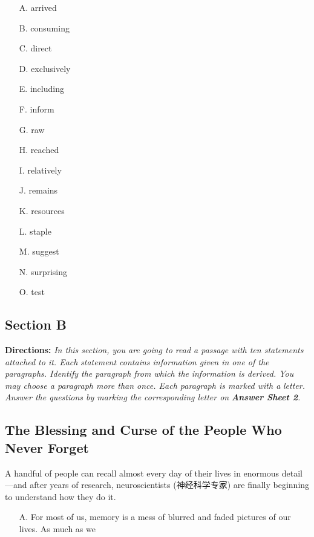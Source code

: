 \documentclass[UTF8,11pt]{ctexart}
\begin{document}
\begin{itemize}[leftmargin=2em,itemsep=.2em,topsep=.4em]\item[A.] arrived
\item[B.] consuming
\item[C.] direct
\item[D.] exclusively
\item[E.] including
\item[F.] inform
\item[G.] raw
\item[H.] reached
\item[I.] relatively
\item[J.] remains
\item[K.] resources
\item[L.] staple
\item[M.] suggest
\item[N.] surprising
\item[O.] test
\end{itemize}

\subsection*{\textbf{Section B}}


\textbf{Directions:}\textit{ In this section, you are going to read a passage with ten statements attached to it. Each} \textit{statement contains information given in one of the paragraphs. Identify the paragraph from which the} \textit{information is derived. You may choose a paragraph more than once. Each paragraph is marked with a} \textit{letter. Answer the questions by marking the corresponding letter on}\textbf{\textit{ Answer Sheet 2}}\textit{.}


\subsection*{\textbf{The Blessing and Curse of the People Who Never Forget}}


A handful of people can recall almost every day of their lives in enormous detail—and after years of research, neuroscientists (神经科学专家) are finally beginning to understand how they do it.


\begin{itemize}[leftmargin=2em,itemsep=.2em,topsep=.4em]\item[A.] For most of us, memory is a mess of blurred and faded pictures of our lives. As much as we
\end{itemize}
\end{document}
